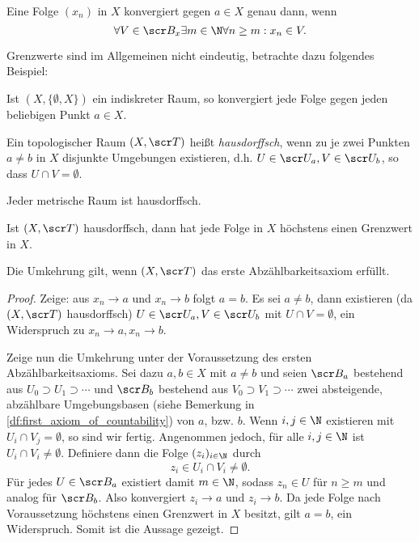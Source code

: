 \begin{prop}
	Eine Folge $(x_n)$ in $X$ konvergiert gegen $a \in X$ genau dann, wenn
	\[
		\forall V \in \scr B_x \exists m \in \N \forall n \ge m : x_n \in V.
	\]
\end{prop}

Grenzwerte sind im Allgemeinen nicht eindeutig, betrachte dazu folgendes Beispiel:

\begin{ex}
	Ist $(X, \{\emptyset, X\})$ ein indiskreter Raum, so konvergiert jede Folge gegen jeden beliebigen Punkt $a \in X$.
\end{ex}

\begin{df}
	Ein topologischer Raum $(X, \scr T)$ heißt \emph{hausdorffsch}, wenn zu je zwei Punkten $a \neq b$ in $X$ disjunkte Umgebungen existieren, d.h. $U \in \scr U_a, V \in \scr U_b$, so dass $U \cap V = \emptyset$.
\end{df}

\begin{ex}
	Jeder metrische Raum ist hausdorffsch.
\end{ex}

\begin{st}
	Ist $(X,\scr T)$ hausdorffsch, dann hat jede Folge in $X$ höchstens einen Grenzwert in $X$.

	Die Umkehrung gilt, wenn $(X, \scr T)$ das erste Abzählbarkeitsaxiom erfüllt.
	\begin{proof}
		Zeige: aus $x_n \to a$ und $x_n \to b$ folgt $a = b$.
		Es sei $a \neq b$, dann existieren (da $(X, \scr T)$ hausdorffsch) $U \in \scr U_a, V \in \scr U_b$ mit $U \cap V = \emptyset$, ein Widerspruch zu $x_n \to a, x_n \to b$.

		Zeige nun die Umkehrung unter der Voraussetzung des ersten Abzählbarkeitsaxioms.
		Sei dazu $a, b \in X$ mit $a \neq b$ und seien $\scr B_a$ bestehend aus $U_0 \supset U_1 \supset \dotsb$ und $\scr B_b$ bestehend aus $V_0 \supset V_1 \supset \dotsb$ zwei absteigende, abzählbare Umgebungsbasen (siehe Bemerkung in \ref{df:first_axiom_of_countability}) von $a$, bzw. $b$.
		Wenn $i,j \in \N$ existieren mit $U_i \cap V_j = \emptyset$, so sind wir fertig.
		Angenommen jedoch, für alle $i,j \in \N$ ist $U_i \cap V_i \neq \emptyset$.
		Definiere dann die Folge $(z_i)_{i\in\N}$ durch
		\[
			z_i \in U_i \cap V_i \neq \emptyset.
		\]
		Für jedes $U \in \scr B_a$ existiert damit $m \in \N$, sodass $z_n \in U$ für $n \ge m$ und analog für $\scr B_b$.
		Also konvergiert $z_i \to a$ und $z_i \to b$.
		Da jede Folge nach Voraussetzung höchstens einen Grenzwert in $X$ besitzt, gilt $a = b$, ein Widerspruch.
		Somit ist die Aussage gezeigt.
	\end{proof}
\end{st}

